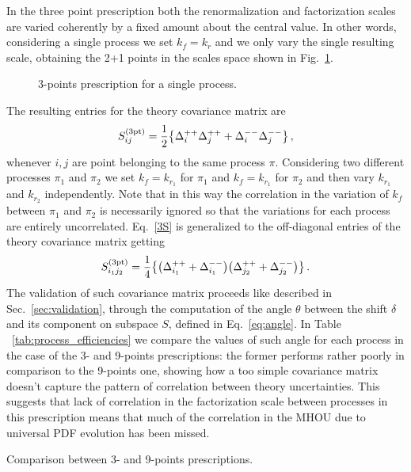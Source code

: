 %
In the three point prescription both the renormalization and factorization scales are varied coherently by a fixed amount about the
central value.
In other words, considering a single process we set $k_f=k_r$ and we only vary the single resulting scale, obtaining the
2+1 points in the scales space shown in Fig.~\ref{fig:3-points}.
\begin{figure}[t]
    \centering
    {}\qquad
    \begin{caption}{3-points prescription for a single process.}
      \label{fig:3-points}
    \end{caption}
\end{figure}
The resulting entries for the theory covariance matrix are 
\begin{align}
    \label{3S}
    S^{(\rm 3pt)}_{ij} = \frac{1}{2}\big\{ \Delta_i^{++}\Delta_j^{++}  + \Delta_i^{--}\Delta_j^{--}\big\} \, ,
\end{align}
whenever $i,j$ are point belonging to the same process $\pi$.
Considering two different processes $\pi_1$ and $\pi_2$ we set $k_f=k_{r_1}$ for $\pi_1$ and $k_f=k_{r_1}$ for $\pi_2$
and then vary $k_{r_1}$ and $k_{r_2}$ independently. Note that in this way the correlation in the variation of $k_f$
between $\pi_1$ and $\pi_2$ is necessarily ignored so that the variations for each process are entirely uncorrelated.
Eq.~\eqref{3S} is generalized to the off-diagonal entries of the theory covariance matrix getting
\begin{equation}
    S^{(\rm 3pt)}_{i_1j_2} = 
    \frac{1}{4}\big\{\big(\Delta_{i_1}^{++} + \Delta_{i_1}^{--} \big) \big(\Delta_{j_2}^{++} + \Delta_{j_2}^{--} \big) \big\}\, .
\end{equation}
The validation of such covariance matrix proceeds like described in Sec.~\ref{sec:validation},
through the computation of the angle $\theta$ between the shift $\delta$ and its component on
subspace $S$, defined in Eq.~\eqref{eq:angle}. In Table ~\ref{tab:process_efficiencies} 
we compare the values of such angle for each process in the case of the 3- and 9-points prescriptions:
the former performs rather poorly in comparison to the 9-points one, showing how a too
simple covariance matrix doesn't capture the pattern of correlation between theory uncertainties. 
This suggests that lack of correlation in the factorization scale between processes in this prescription
means that much of the correlation in the MHOU due to universal PDF evolution has been missed.
\begin{table}[ht!]
	\centering
	\small
	
        \vspace{3mm}
	\caption{Comparison between 3- and 9-points prescriptions.}
	\label{tab:process_efficiencies}
\end{table}

